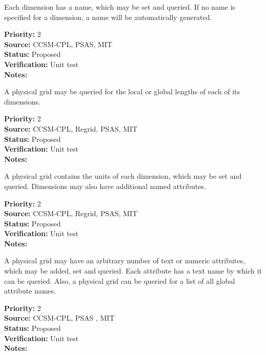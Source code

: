 Each dimension has a name, which may be set and queried.  If no name is specified
for a dimension, a name will be automatically generated.
\begin{reqlist}
{\bf Priority:} 2 \\
{\bf Source:} CCSM-CPL, 
PSAS, MIT \\
{\bf Status:} Proposed \\
{\bf Verification:} Unit test \\
{\bf Notes:} 
\end{reqlist}

A physical grid may be queried for the local or global lengths of each of its dimensions.
\begin{reqlist}
{\bf Priority:} 2 \\
{\bf Source:} CCSM-CPL, Regrid, 
PSAS, MIT \\
{\bf Status:} Proposed \\
{\bf Verification:} Unit test \\
{\bf Notes:} 
\end{reqlist}

A physical grid contains the units of each dimension, which may be set and queried. 
Dimensions may also have additional named attributes.
\begin{reqlist}
{\bf Priority:} 2 \\
{\bf Source:} CCSM-CPL, Regrid, 
PSAS, MIT  \\
{\bf Status:} Proposed \\
{\bf Verification:} Unit test \\
{\bf Notes:} 
\end{reqlist}

A physical grid may have an arbitrary number of text or numeric attributes,
which may be added, set and queried.  Each attribute has a text name by which it
can be queried.  Also, a physical grid can be queried for a list of all global
attribute names.

\begin{reqlist}
{\bf Priority:} 2 \\
{\bf Source:} CCSM-CPL, 
PSAS , MIT \\
{\bf Status:} Proposed \\
{\bf Verification:} Unit test \\
{\bf Notes:} 
\end{reqlist}

